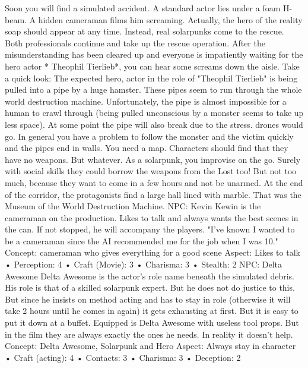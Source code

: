 Soon you will find a simulated accident. A standard actor lies under a foam H-beam. A hidden cameraman films him
screaming. Actually, the hero of the reality soap should appear at any time. Instead, real solarpunks come to the rescue.
Both professionals continue and take up the rescue operation.
After the misunderstanding has been cleared up and everyone is impatiently waiting for the hero actor * Theophil Tierlieb*,
you can hear some screams down the aisle. Take a quick look: The expected hero, actor in the role of "Theophil Tierlieb" is
being pulled into a pipe by a huge hamster. These pipes seem to run through the whole world destruction machine.
Unfortunately, the pipe is almost impossible for a human to crawl through (being pulled unconscious by a monster seems to
take up less space). At some point the pipe will also break due to the stress. drones would go. In general you have a problem
to follow the monster and the victim quickly and the pipes end in walls. You need a map.
Characters should find that they have no weapons. But whatever. As a solarpunk, you improvise on the go.
Surely with social skills they could borrow the weapons from the Lost too! But not too much, because they want to come in a
few hours and not be unarmed.
At the end of the corridor, the protagonists find a large hall lined with marble. That was the Museum of the World Destruction
Machine.
NPC: Kevin
Kewin is the cameraman on the production. Likes to talk and always wants the best scenes in the can. If not stopped, he will
accompany the players.
"I've known I wanted to be a cameraman since the AI recommended me for the job when I was 10."
Concept: cameraman who gives everything for a good scene
Aspect: Likes to talk
• Perception: 4
• Craft (Movie): 3
• Charisma: 3
• Stealth: 2
NPC: Delta Awesome
Delta Awesome is the actor's role name beneath the simulated debris. His role is that of a skilled solarpunk expert. But he
does not do justice to this. But since he insists on method acting and has to stay in role (otherwise it will take 2 hours until he
comes in again) it gets exhausting at first. But it is easy to put it down at a buffet.
Equipped is Delta Awesome with useless tool props. But in the film they are always exactly the ones he needs. In reality it
doesn't help.
Concept: Delta Awesome, Solarpunk and Hero
Aspect: Always stay in character
• Craft (acting): 4
• Contacts: 3
• Charisma: 3
• Deception: 2


